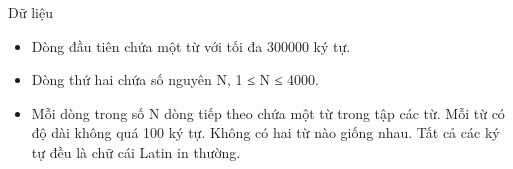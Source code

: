Dữ liệu
\begin{itemize}
	\item     Dòng đầu tiên chứa một từ với tối đa 300000 ký tự.   
	\item     Dòng thứ hai chứa số nguyên N, 1 ≤ N ≤ 4000.   
	\item     Mỗi dòng trong số N dòng tiếp theo chứa một từ trong tập các từ. Mỗi từ có độ dài không quá 100 ký tự. Không có hai từ nào giống nhau. Tất cả   các ký tự đều là chữ cái Latin in thường.   
\end{itemize}